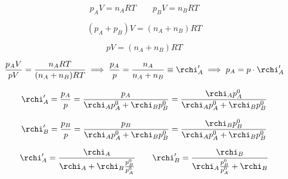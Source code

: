 $$p_AV=n_ART
\qquad
p_BV=n_BRT$$

$$(p_A + p_B)V= (n_A + n_B)RT$$

$$pV=(n_A + n_B)RT$$

$$\frac{p_AV}{pV}= \frac{n_ART}{(n_A + n_B)RT}
\implies
\frac{p_A}{p} = \frac{n_A}{n_A + n_B}\equiv \rchi '_A
\implies
p_A=p \cdot \rchi '_A$$

$$\rchi '_A=\frac{p_A}{p}=
\frac{p_A}{\rchi_A p_A^0 + \rchi_B p_B^0}=
\frac{\rchi_A p_A^0}{\rchi_A p_A^0 + \rchi_B p_B^0}$$

$$\rchi '_B=\frac{p_B}{p}=
\frac{p_B}{\rchi_A p_A^0 + \rchi_B p_B^0}=
\frac{\rchi_B p_B^0}{\rchi_A p_A^0 + \rchi_B p_B^0}$$

$$\rchi'_A=\frac{\rchi_A}{\rchi_A + \rchi_B\frac{p^0_B}{p^0_A}}
\qquad
\rchi'_B=\frac{\rchi_B}{\rchi_A\frac{p^0_B}{p^0_A} + \rchi_B}$$